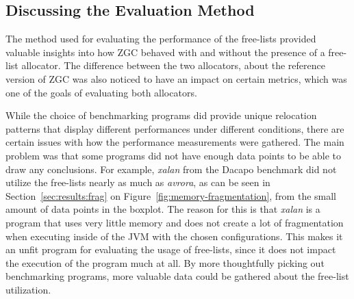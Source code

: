 \subsection{Discussing the Evaluation Method}
The method used for evaluating the performance of the free-lists provided valuable insights into how ZGC behaved with and without the presence of a free-list allocator. The difference between the two allocators, about the reference version of ZGC was also noticed to have an impact on certain metrics, which was one of the goals of evaluating both allocators.

While the choice of benchmarking programs did provide unique relocation patterns that display different performances under different conditions, there are certain issues with how the performance measurements were gathered. The main problem was that some programs did not have enough data points to be able to draw any conclusions. For example, \textit{xalan} from the Dacapo benchmark did not utilize the free-lists nearly as much as \textit{avrora}, as can be seen in Section~\ref{sec:results:frag} on Figure~\ref{fig:memory-fragmentation}, from the small amount of data points in the boxplot. The reason for this is that \textit{xalan} is a program that uses very little memory and does not create a lot of fragmentation when executing inside of the JVM with the chosen configurations. This makes it an unfit program for evaluating the usage of free-lists, since it does not impact the execution of the program much at all. By more thoughtfully picking out benchmarking programs, more valuable data could be gathered about the free-list utilization.

